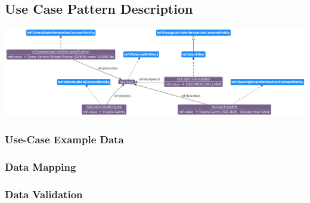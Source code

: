 \subsection*{Use Case Pattern Description}

\includegraphics[scale=0.5]{scenarios/information-and-aboutness/images/uc1-ices.png}


\subsubsection*{Use-Case Example Data}


\subsubsection*{Data Mapping}


\subsubsection*{Data Validation}

